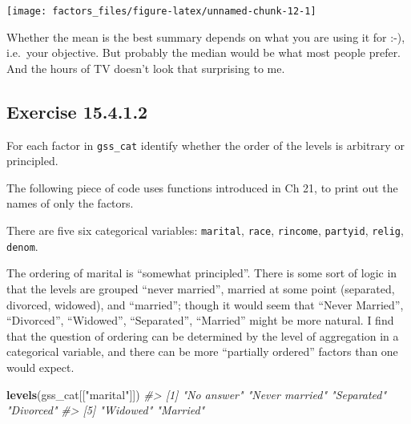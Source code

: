 \documentclass[]{book}
\newenvironment{Shaded}{\begin{snugshade}}{\end{snugshade}}
\newcommand{\CommentTok}[1]{\textcolor[rgb]{0.56,0.35,0.01}{\textit{#1}}}
\newcommand{\KeywordTok}[1]{\textcolor[rgb]{0.13,0.29,0.53}{\textbf{#1}}}
\newcommand{\NormalTok}[1]{#1}
\newcommand{\OperatorTok}[1]{\textcolor[rgb]{0.81,0.36,0.00}{\textbf{#1}}}
\newcommand{\StringTok}[1]{\textcolor[rgb]{0.31,0.60,0.02}{#1}}
\theoremstyle{plain}
\theoremstyle{remark}
\begin{document}
\begin{center}\texttt{[image: factors\_files/figure-latex/unnamed-chunk-12-1]} \end{center}

Whether the mean is the best summary depends on what you are using it
for :-), i.e.~your objective. But probably the median would be what most
people prefer. And the hours of TV doesn't look that surprising to me.

\hypertarget{exercise-15.4.1.2}{%
\subsection*{\texorpdfstring{Exercise
{15.4.1.2}}{Exercise 15.4.1.2}}\label{exercise-15.4.1.2}}

For each factor in \texttt{gss\_cat} identify whether the order of the
levels is arbitrary or principled.

The following piece of code uses functions introduced in Ch 21, to print
out the names of only the factors.

\begin{Shaded}
\end{Shaded}

There are five six categorical variables: \texttt{marital},
\texttt{race}, \texttt{rincome}, \texttt{partyid}, \texttt{relig},
\texttt{denom}.

The ordering of marital is ``somewhat principled''. There is some sort
of logic in that the levels are grouped ``never married'', married at
some point (separated, divorced, widowed), and ``married''; though it
would seem that ``Never Married'', ``Divorced'', ``Widowed'',
``Separated'', ``Married'' might be more natural. I find that the
question of ordering can be determined by the level of aggregation in a
categorical variable, and there can be more ``partially ordered''
factors than one would expect.

\begin{Shaded}
\begin{Highlighting}[]
\KeywordTok{levels}\NormalTok{(gss_cat[[}\StringTok{"marital"}\NormalTok{]])}
\CommentTok{#> [1] "No answer"     "Never married" "Separated"     "Divorced"     }
\CommentTok{#> [5] "Widowed"       "Married"}
\end{Highlighting}
\end{Shaded}
\end{document}
